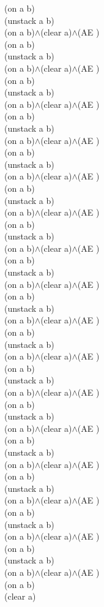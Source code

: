{{(on a b)\\
(unstack a b)\\
(on a b)$\wedge$(clear a)$\wedge$(AE )\\
(on a b)\\
(unstack a b)\\
(on a b)$\wedge$(clear a)$\wedge$(AE )\\
(on a b)\\
(unstack a b)\\
(on a b)$\wedge$(clear a)$\wedge$(AE )\\
(on a b)\\
(unstack a b)\\
(on a b)$\wedge$(clear a)$\wedge$(AE )\\
(on a b)\\
(unstack a b)\\
(on a b)$\wedge$(clear a)$\wedge$(AE )\\
(on a b)\\
(unstack a b)\\
(on a b)$\wedge$(clear a)$\wedge$(AE )\\
(on a b)\\
(unstack a b)\\
(on a b)$\wedge$(clear a)$\wedge$(AE )\\
(on a b)\\
(unstack a b)\\
(on a b)$\wedge$(clear a)$\wedge$(AE )\\
(on a b)\\
(unstack a b)\\
(on a b)$\wedge$(clear a)$\wedge$(AE )\\
(on a b)\\
(unstack a b)\\
(on a b)$\wedge$(clear a)$\wedge$(AE )\\
(on a b)\\
(unstack a b)\\
(on a b)$\wedge$(clear a)$\wedge$(AE )\\
(on a b)\\
(unstack a b)\\
(on a b)$\wedge$(clear a)$\wedge$(AE )\\
(on a b)\\
(unstack a b)\\
(on a b)$\wedge$(clear a)$\wedge$(AE )\\
(on a b)\\
(unstack a b)\\
(on a b)$\wedge$(clear a)$\wedge$(AE )\\
(on a b)\\
(unstack a b)\\
(on a b)$\wedge$(clear a)$\wedge$(AE )\\
(on a b)\\
(unstack a b)\\
(on a b)$\wedge$(clear a)$\wedge$(AE )\\
(on a b)\\
(clear a)\\
}%
}

